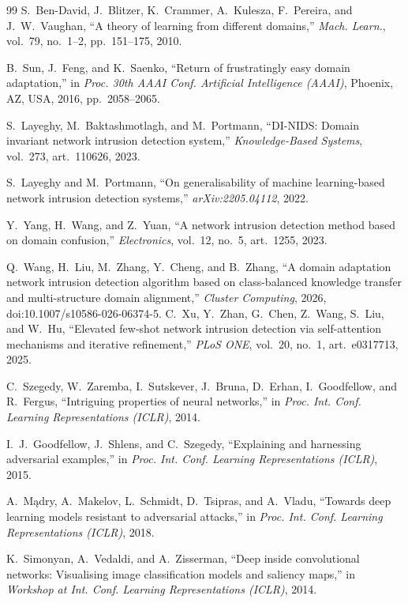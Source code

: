 \documentclass[11pt,a4paper]{article}
\begin{document}
\begin{thebibliography}{99}
 S.~Ben-David, J.~Blitzer, K.~Crammer, A.~Kulesza, F.~Pereira,
and J.~W.~Vaughan, ``A theory of learning from different domains,''
\emph{Mach. Learn.}, vol.~79, no.~1--2, pp.~151--175, 2010.

 B.~Sun, J.~Feng, and K.~Saenko, ``Return of frustratingly easy
domain adaptation,'' in \emph{Proc. 30th AAAI Conf. Artificial Intelligence
(AAAI)}, Phoenix, AZ, USA, 2016, pp.~2058--2065.

 S.~Layeghy, M.~Baktashmotlagh, and M.~Portmann, ``DI-NIDS:
Domain invariant network intrusion detection system,'' \emph{Knowledge-Based
Systems}, vol.~273, art.~110626, 2023.

 S.~Layeghy and M.~Portmann, ``On generalisability of
machine learning-based network intrusion detection systems,''
\emph{arXiv:2205.04112}, 2022.

 Y.~Yang, H.~Wang, and Z.~Yuan, ``A network intrusion detection
method based on domain confusion,'' \emph{Electronics}, vol.~12, no.~5, art.~1255,
2023.

 Q.~Wang, H.~Liu, M.~Zhang, Y.~Cheng, and B.~Zhang, ``A domain
adaptation network intrusion detection algorithm based on class-balanced knowledge
transfer and multi-structure domain alignment,'' \emph{Cluster Computing}, 2026,
doi:10.1007/s10586-026-06374-5.
 C.~Xu, Y.~Zhan, G.~Chen, Z.~Wang, S.~Liu, and W.~Hu,
``Elevated few-shot network intrusion detection via self-attention mechanisms
and iterative refinement,'' \emph{PLoS ONE}, vol.~20, no.~1, art.~e0317713, 2025.

 C.~Szegedy, W.~Zaremba, I.~Sutskever, J.~Bruna, D.~Erhan,
I.~Goodfellow, and R.~Fergus, ``Intriguing properties of neural networks,'' in
\emph{Proc. Int. Conf. Learning Representations (ICLR)}, 2014.

 I.~J.~Goodfellow, J.~Shlens, and C.~Szegedy, ``Explaining and
harnessing adversarial examples,'' in \emph{Proc. Int. Conf. Learning
Representations (ICLR)}, 2015.

 A.~M\k{a}dry, A.~Makelov, L.~Schmidt, D.~Tsipras, and A.~Vladu,
``Towards deep learning models resistant to adversarial attacks,'' in \emph{Proc.
Int. Conf. Learning Representations (ICLR)}, 2018.

 K.~Simonyan, A.~Vedaldi, and A.~Zisserman, ``Deep inside
convolutional networks: Visualising image classification models and saliency
maps,'' in \emph{Workshop at Int. Conf. Learning Representations (ICLR)}, 2014.


\end{thebibliography}
\end{document}
